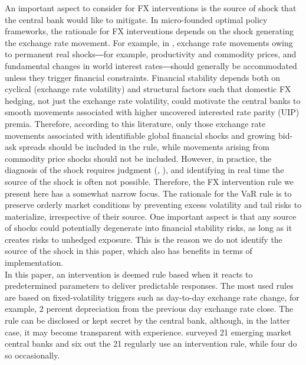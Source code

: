 \documentclass[11pt]{article}
\begin{document}
An important  aspect to consider for  FX interventions is the  source of shock
that the central bank would like  to mitigate. In micro-founded optimal policy
frameworks, the rationale for FX interventions depends on the shock generating
the exchange rate  movement. For example, in \cite{basu2020}, exchange
rate movements  owing to permanent  real shocks―for example,  productivity and
commodity  prices,  and fundamental  changes  in  world interest  rates―should
generally be accommodated unless they trigger financial constraints. Financial
stability depends both  on cyclical (exchange rate  volatility) and structural
factors such that domestic FX hedging,  not just the exchange rate volatility,
could motivate  the central banks  to smooth movements associated  with higher
uncovered interested  rate parity (UIP)  premia. Therefore, according  to this
literature, only  those exchange  rate movements associated  with identifiable
global financial shocks and growing bid-ask  spreads should be included in the
rule,  while movements  arising  from  commodity price  shocks  should not  be
included. However, in  practice, the diagnosis of the  shock requires judgment
(\cite{basu2020}, \cite{cavallino2019}), and  identifying in  real time  the
source of the shock is often not possible. Therefore, the FX intervention rule
we present here has a somewhat narrow focus. The rationale for the VaR rule is
to preserve orderly market conditions by preventing excess volatility and tail
risks to  materialize, irrespective of  their source. One important  aspect is
that  any  source  of  shocks  could  potentially  degenerate  into  financial
stability risks, as long as it creates risks to unhedged exposure. This is the
reason we do  not identify the source  of the shock in this  paper, which also
has benefits in terms of implementation.\\

In  this  paper, an  intervention  is  deemed rule  based  when  it reacts  to
predetermined parameters to deliver predictable responses. The most used rules
are  based  on fixed-volatility  triggers  such  as day-to-day  exchange  rate
change, for  example, 2  percent depreciation from  the previous  day exchange
rate close.   The rule can  be disclosed or kept  secret by the  central bank,
although,   in   the   latter   case,   it   may   become   transparent   with
experience. \cite{patel2019} surveyed 21 emerging market central banks and six
out  the   21  regularly  use   an  intervention   rule,  while  four   do  so
occasionally.\\
\end{document}

